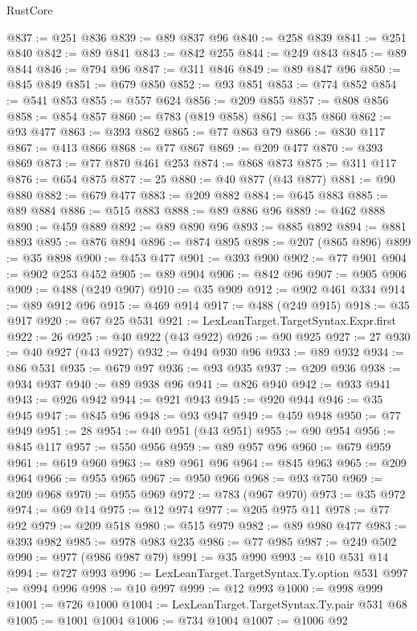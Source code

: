 \begin{lexlean}{RustCore}
\begin{coremodule}
@837 := @251 @836
@839 := @89 @837 @96
@840 := @258 @839
@841 := @251 @840
@842 := @89 @841
@843 := @842 @255
@844 := @249 @843
@845 := @89 @844
@846 := @794 @96
@847 := @311 @846
@849 := @89 @847 @96
@850 := @845 @849
@851 := @679 @850
@852 := @93 @851
@853 := @774 @852
@854 := @541 @853
@855 := @557 @624
@856 := @209 @855
@857 := @808 @856
@858 := @854 @857
@860 := @783 (@819 @858)
@861 := @35 @860
@862 := @93 @477
@863 := @393 @862
@865 := @77 @863 @79
@866 := @830 @117
@867 := @413 @866
@868 := @77 @867
@869 := @209 @477
@870 := @393 @869
@873 := @77 @870 @461 @253
@874 := @868 @873
@875 := @311 @117
@876 := @654 @875
@877 := 25
@880 := @40 @877 (@43 @877)
@881 := @90 @880
@882 := @679 @477
@883 := @209 @882
@884 := @645 @883
@885 := @89 @884
@886 := @515 @883
@888 := @89 @886 @96
@889 := @462 @888
@890 := @459 @889
@892 := @89 @890 @96
@893 := @885 @892
@894 := @881 @893
@895 := @876 @894
@896 := @874 @895
@898 := @207 (@865 @896)
@899 := @35 @898
@900 := @453 @477
@901 := @393 @900
@902 := @77 @901
@904 := @902 @253 @452
@905 := @89 @904
@906 := @842 @96
@907 := @905 @906
@909 := @488 (@249 @907)
@910 := @35 @909
@912 := @902 @461 @334
@914 := @89 @912 @96
@915 := @469 @914
@917 := @488 (@249 @915)
@918 := @35 @917
@920 := @67 @25 @531
@921 := LexLeanTarget.TargetSyntax.Expr.first
@922 := 26
@925 := @40 @922 (@43 @922)
@926 := @90 @925
@927 := 27
@930 := @40 @927 (@43 @927)
@932 := @494 @930 @96
@933 := @89 @932
@934 := @86 @531
@935 := @679 @97
@936 := @93 @935
@937 := @209 @936
@938 := @934 @937
@940 := @89 @938 @96
@941 := @826 @940
@942 := @933 @941
@943 := @926 @942
@944 := @921 @943
@945 := @920 @944
@946 := @35 @945
@947 := @845 @96
@948 := @93 @947
@949 := @459 @948
@950 := @77 @949
@951 := 28
@954 := @40 @951 (@43 @951)
@955 := @90 @954
@956 := @845 @117
@957 := @550 @956
@959 := @89 @957 @96
@960 := @679 @959
@961 := @619 @960
@963 := @89 @961 @96
@964 := @845 @963
@965 := @209 @964
@966 := @955 @965
@967 := @950 @966
@968 := @93 @750
@969 := @209 @968
@970 := @955 @969
@972 := @783 (@967 @970)
@973 := @35 @972
@974 := @69 @14
@975 := @12 @974
@977 := @205 @975 @11
@978 := @77 @92
@979 := @209 @518
@980 := @515 @979
@982 := @89 @980 @477
@983 := @393 @982
@985 := @978 @983 @235
@986 := @77 @985
@987 := @249 @502
@990 := @977 (@986 @987 @79)
@991 := @35 @990
@993 := @10 @531 @14
@994 := @727 @993
@996 := LexLeanTarget.TargetSyntax.Ty.option @531
@997 := @994 @996
@998 := @10 @997
@999 := @12 @993
@1000 := @998 @999
@1001 := @726 @1000
@1004 := LexLeanTarget.TargetSyntax.Ty.pair @531 @68
@1005 := @1001 @1004
@1006 := @734 @1004
@1007 := @1006 @92

\end{coremodule}
\end{lexlean}
